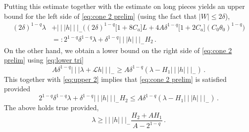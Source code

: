 \documentclass{amsart}
\numberwithin{equation}{section}
\newcommand\cL{{\mathcal L}}
\newcommand{\tri}{{|\:\!\!|\:\!\!|}}
\begin{document}
Putting this estimate together with the estimate on long pieces yields an upper bound
for the left side of \eqref{eq:cone 2 prelim} (using the fact that $|W| \le 2\delta$),
\begin{equation}
\label{eq:upper 2}
\begin{split}
(2\delta)^{1-q}\lambda & + \tri h \tri _- \Big( (2\delta)^{1-q} \big[1 + 8 C_a \big] L 
+ 4 A \delta^{1-q} \big[ 1 + 2 C_a \big] (C_0 \theta_0)^{1-q} \Big) \\
& =: 2^{1-q} \delta^{1-q} \lambda + \delta^{1-q} \tri h \tri_- H_2 \, .
\end{split}
\end{equation}
On the other hand, we obtain a lower bound on the right side of \eqref{eq:cone 2 prelim}
using \eqref{eq:lower tri}
\[
A \delta^{1-q} \tri \lambda + \cL h \tri_- \ge A \delta^{1-q} ( \lambda - H_1 \tri h \tri_- ) \, .
\]
This together with \eqref{eq:upper 2} implies that \eqref{eq:cone 2 prelim} is satisfied provided
\[
2^{1-q} \delta^{1-q} \lambda + \delta^{1-q} \tri h \tri_- H_2 \le  A \delta^{1-q} ( \lambda - H_1 \tri h \tri_- ) \, .
\]
The above holds true provided,
\begin{equation}
\label{eq:cone 2 check}
\lambda \ge \tri h \tri_- \frac{H_2 + A H_1}{A - 2^{1-q}} \, .
\end{equation}
\end{document}
